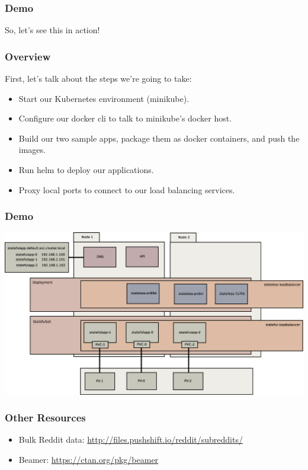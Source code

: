 \documentclass{beamer}
\begin{document}
\begin{frame}
    \frametitle{Demo}
    \begin{center}
        \Huge So, let's see this in action!
    \end{center}
\end{frame}

\begin{frame}
    \frametitle{Overview}
    First, let's talk about the steps we're going to take:
    \begin{itemize}
        \item Start our Kubernetes environment (minikube).
        \item Configure our docker cli to talk to minikube's docker host.
        \item Build our two sample apps, package them as docker containers, and push the images.
        \item Run helm to deploy our applications.
        \item Proxy local ports to connect to our load balancing services.
    \end{itemize}
\end{frame}

\begin{frame}
    \frametitle{Demo}
    \includegraphics[width=\textwidth,height=\textheight,keepaspectratio]{graphics/08-loadBalancer.eps}
\end{frame}

\begin{frame}
\frametitle{Other Resources}
\begin{itemize}
    \item Bulk Reddit data: \href{http://files.pushshift.io/reddit/subreddits/}{http://files.pushshift.io/reddit/subreddits/}
    \item Beamer: \href{https://ctan.org/pkg/beamer}{https://ctan.org/pkg/beamer}
\end{itemize}
\end{frame}
\end{document}
